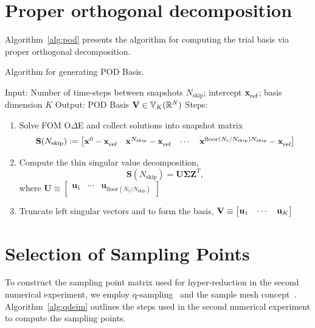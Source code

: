 \documentclass[3p,computermodern,10pt]{elsarticle}
\begin{document}
\begin{appendices}
\section{Proper orthogonal decomposition}
Algorithm~\ref{alg:pod} presents the algorithm for computing the trial basis via proper orthogonal decomposition.
\begin{algorithm}
\caption{Algorithm for generating POD Basis.}
\label{alg:pod}
Input: Number of time-steps between snapshots $N_{\text{skip}}$; intercept $\stateInterceptArg{}$; basis dimension $K$ \; 
Output: POD Basis $\basisspace \in \mathbb{V}_{K}(\RR{N})$ \;
Steps:
\begin{enumerate}
    \item Solve FOM O$\Delta$E and collect solutions into snapshot matrix
$$\mathbf{S}(N_{\text{skip}}) \defeq \begin{bmatrix} \stateFOMDiscreteArg{0} - \stateInterceptArg{n} & \stateFOMDiscreteArg{N_{\text{skip}}} - \stateInterceptArg{n} & \cdots & \stateFOMDiscreteArg{\text{floor}(N_t/N_{\text{skip}})N_{\text{skip}}} - \stateInterceptArg{n} \end{bmatrix}$$
    \item Compute the thin singular value decomposition, $$\mathbf{S} (N_{\text{skip}}) = \mathbf{U \Sigma Z}^T,$$
    where $\mathbf{U} \equiv \begin{bmatrix} \mathbf{u}_1 & \cdots & \mathbf{u}_{\text{floor}(N_t/N_{\text{skip}})}\end{bmatrix}$
    \item Truncate left singular vectors and to form the basis, $\basisspace \equiv \begin{bmatrix} \mathbf{u}_1 & \cdots & \mathbf{u}_K \end{bmatrix}$
\end{enumerate}


\end{algorithm}


\section{Selection of Sampling Points}
To construct the sampling point matrix used for hyper-reduction in the second numerical experiment, we employ q-sampling~\cite{qdeim_drmac} and the sample 
mesh concept~\cite{carlberg_gnat}. Algorithm~\ref{alg:qdeim} outlines the steps used in the second numerical experiment to compute the sampling points.


\end{appendices}
\end{document}
